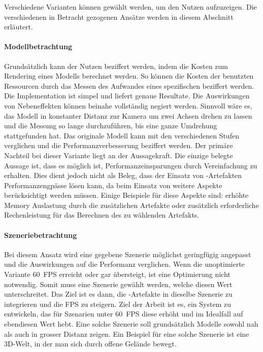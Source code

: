 Verschiedene Varianten können gewählt werden, um den Nutzen aufzuzeigen. Die verschiedenen in Betracht gezogenen Ansätze werden in diesem Abschnitt erläutert.

\paragraph{Modellbetrachtung}
Grundsätzlich kann der Nutzen beziffert werden, indem die Kosten zum Rendering eines Modells berechnet werden. So können die Kosten der benutzten  Ressourcen durch das Messen des Aufwandes eines spezifischen  beziffert werden. Die Implementation ist simpel und liefert genaue Resultate. Die Auswirkungen von Nebeneffekten können beinahe vollständig negiert werden.
Sinnvoll wäre es, das Modell in konstanter Distanz zur Kamera um zwei Achsen drehen zu lassen und die Messung so lange durchzuführen, bis eine ganze Umdrehung stattgefunden hat. Das originale Modell kann mit den verschiedenen Stufen verglichen und die Performanzverbesserung beziffert werden.
Der primäre Nachteil bei dieser Variante liegt an der Aussagekraft. Die einzige belegte Aussage ist, dass es möglich ist, Performanzeinsparungen durch Vereinfachung zu erhalten. Dies dient jedoch nicht als Beleg, dass der Einsatz von -Artefakten Performanzengpässe lösen kann, da beim Einsatz von  weitere Aspekte berücksichtigt werden müssen. Einige Beispiele für diese Aspekte sind: erhöhte Memory Auslastung durch die zusätzlichen Artefakte oder zusätzlich erforderliche Rechenleistung für das Berechnen des zu wählenden Artefakts.

\pagebreak

\paragraph{Szeneriebetrachtung}
Bei diesem Ansatz wird eine gegebene Szenerie möglichst geringfügig angepasst und die Auswirkungen auf die Performanz verglichen.
Wenn die unoptimierte Variante 60 \gls{FPS} erreicht oder gar übersteigt, ist eine Optimierung nicht notwendig. Somit muss eine Szenerie gewählt werden, welche diesen Wert unterschreitet.
Das Ziel ist es dann, die -Artefakte in dieselbe Szenerie zu integrieren und die \gls{FPS} zu steigern. Ziel der Arbeit ist es, ein System zu entwickeln, das für Szenarien unter 60 \gls{FPS} diese erhöht und im Idealfall auf ebendiesen Wert hebt.
Eine solche Szenerie soll grundsätzlich Modelle sowohl nah als auch in grosser Distanz zeigen. Ein Beispiel für eine solche Szenerie ist eine 3D-Welt, in der man sich durch offene Gelände bewegt.

